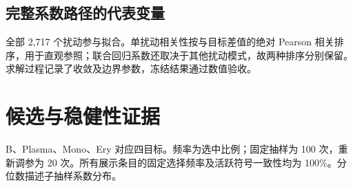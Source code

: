 \clearpage\subsection{完整系数路径的代表变量}
全部 2,717 个扰动参与拟合。单扰动相关性按与目标差值的绝对 Pearson 相关排序，用于直观参照；联合回归系数还取决于其他扰动模式，故两种排序分别保留。求解过程记录了收敛及边界参数，冻结结果通过数值验收。
\clearpage\section{候选与稳健性证据}\label{app:C}\setcounter{figure}{0}\setcounter{table}{0}
B、Plasma、Mono、Ery 对应四目标。频率为选中比例；固定抽样为 100 次，重新调参为 20 次。所有展示条目的固定选择频率及活跃符号一致性均为 100\%。分位数描述子抽样系数分布。
